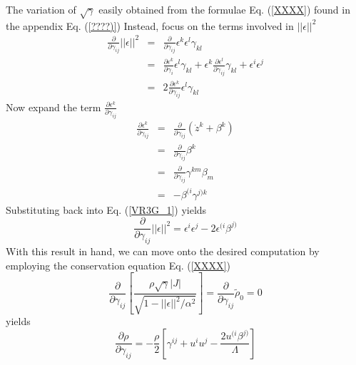 \documentclass[12pt]{article}
\begin{document}
The variation of $ \sqrt{\gamma} $ easily obtained from the formulae Eq. (\ref{XXXX})
found in the appendix Eq. (\ref{????)}) Instead, focus on the terms involved
in $ || \epsilon || ^ 2$
\begin{eqnarray}\label{VR3G_1}
\frac{\partial }{\partial {\gamma}_{i j}} || \epsilon || ^2 & = & \frac{\partial }{\partial {\gamma}_{i j}} {\epsilon }^{ k } {\epsilon }^{ l } {\gamma}_{k l} \nonumber \\
& = & \frac{\partial {\epsilon }^{ k }}{\partial {\gamma}_{i }} {\epsilon }^{ l } {\gamma}_{k l}
+ {\epsilon }^{ k } \frac{\partial {\epsilon }^{ l }}{\partial {\gamma}_{i j}} {\gamma}_{k l}
+ {\epsilon }^{ i } {\epsilon }^{ j } \nonumber \\
& = & 2 \frac{\partial {\epsilon }^{ k }}{\partial {\gamma}_{i j}} {\epsilon }^{ l } {\gamma}_{k l}
\end{eqnarray}
Now expand the term $ \frac{\partial {\epsilon }^{ k }}{\partial {\gamma}_{i j}} $
\begin{eqnarray}\label{VR3G_2}
\frac{\partial {\epsilon }^{ k }}{\partial {\gamma}_{i j}} & = & \frac{\partial }{\partial {\gamma}_{i j}} \left( {\dot z}^{k} + {\beta}^{k} \right) \nonumber \\
& = & \frac{\partial }{\partial {\gamma}_{i j}} {\beta}^{k} \nonumber \\
& = & \frac{\partial }{\partial {\gamma}_{i j}} {\gamma}^{k m} {\beta}_{m} \nonumber \\
& = & - {\beta}^{(i} {\gamma}^{j) k}
\end{eqnarray}
Substituting back into Eq. (\ref{VR3G_1}) yields
\begin{equation}\label{VR3G_3}
\frac{\partial }{\partial {\gamma}_{i j}} || \epsilon || ^2 = {\epsilon }^{ i } {\epsilon }^{ j }
- 2 {\epsilon }^{ (i } {\beta}^{j)}
\end{equation}
With this result in hand, we can move onto the desired computation by
employing the conservation equation Eq. (\ref{XXXX})
\begin{equation}\label{VR3G_4}
\frac{\partial }{\partial {\gamma}_{i j}} \left[ \frac{ \rho \sqrt{\gamma} |J| }{ \sqrt{1 - || \epsilon || ^2 / \alpha ^2 } } \right]
= \frac{\partial }{\partial {\gamma}_{i j}} { \tilde \rho }_{0} = 0
\end{equation}
yields
\begin{equation}\label{VR3G_5}
\frac{\partial \rho}{\partial {\gamma}_{i j}} = - \frac{\rho}{2} \left[ {\gamma}^{i j}
+ {u}^{i} {u}^{j}
- \frac{ 2 {u}^{(i} {\beta}^{j)} }{ \Lambda } \right]
\end{equation}
\end{document}
